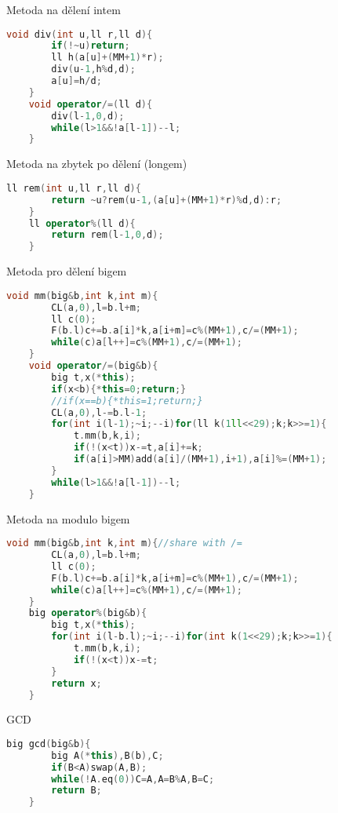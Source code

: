 \documentclass[11pt]{article}
\begin{document}
\begin{center}
Metoda na dělení intem
\end{center}
\begin{lstlisting}[language=C++]
    void div(int u,ll r,ll d){
        if(!~u)return;
        ll h(a[u]+(MM+1)*r);
        div(u-1,h%d,d);
        a[u]=h/d;
    }
    void operator/=(ll d){
        div(l-1,0,d);
        while(l>1&&!a[l-1])--l;
    }
\end{lstlisting}
\begin{center}
Metoda na zbytek po dělení (longem)
\end{center}
\begin{lstlisting}[language=C++]
    ll rem(int u,ll r,ll d){
        return ~u?rem(u-1,(a[u]+(MM+1)*r)%d,d):r;
    }
    ll operator%(ll d){
        return rem(l-1,0,d);
    }
\end{lstlisting}
\begin{center}
Metoda pro dělení bigem
\end{center}
\begin{lstlisting}[language=C++]
    void mm(big&b,int k,int m){
        CL(a,0),l=b.l+m;
        ll c(0);
        F(b.l)c+=b.a[i]*k,a[i+m]=c%(MM+1),c/=(MM+1);
        while(c)a[l++]=c%(MM+1),c/=(MM+1);
    }
    void operator/=(big&b){
        big t,x(*this);
        if(x<b){*this=0;return;}
        //if(x==b){*this=1;return;}
        CL(a,0),l-=b.l-1;
        for(int i(l-1);~i;--i)for(ll k(1ll<<29);k;k>>=1){
            t.mm(b,k,i);
            if(!(x<t))x-=t,a[i]+=k;
            if(a[i]>MM)add(a[i]/(MM+1),i+1),a[i]%=(MM+1);
        }
        while(l>1&&!a[l-1])--l;
    }
\end{lstlisting}
\begin{center}
Metoda na modulo bigem
\end{center}
\begin{lstlisting}[language=C++]
    void mm(big&b,int k,int m){//share with /=
        CL(a,0),l=b.l+m;
        ll c(0);
        F(b.l)c+=b.a[i]*k,a[i+m]=c%(MM+1),c/=(MM+1);
        while(c)a[l++]=c%(MM+1),c/=(MM+1);
    }
    big operator%(big&b){
        big t,x(*this);
        for(int i(l-b.l);~i;--i)for(int k(1<<29);k;k>>=1){
            t.mm(b,k,i);
            if(!(x<t))x-=t;
        }
        return x;
    }
\end{lstlisting}
\begin{center}
GCD
\end{center}
\begin{lstlisting}[language=C++]
    big gcd(big&b){
        big A(*this),B(b),C;
        if(B<A)swap(A,B);
        while(!A.eq(0))C=A,A=B%A,B=C;
        return B;
    }
\end{lstlisting}
\end{document}
